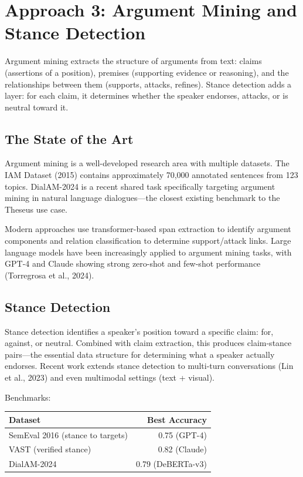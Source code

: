 \documentclass[11pt,letterpaper]{article}
\begin{document}
\section{Approach 3: Argument Mining and Stance Detection}

Argument mining extracts the structure of arguments from text: claims (assertions of a position), premises (supporting evidence or reasoning), and the relationships between them (supports, attacks, refines). Stance detection adds a layer: for each claim, it determines whether the speaker endorses, attacks, or is neutral toward it.

\subsection{The State of the Art}

Argument mining is a well-developed research area with multiple datasets. The IAM Dataset (2015) contains approximately 70,000 annotated sentences from 123 topics. DialAM-2024 is a recent shared task specifically targeting argument mining in natural language dialogues—the closest existing benchmark to the Theseus use case.

Modern approaches use transformer-based span extraction to identify argument components and relation classification to determine support/attack links. Large language models have been increasingly applied to argument mining tasks, with GPT-4 and Claude showing strong zero-shot and few-shot performance (Torregrosa et al., 2024).

\subsection{Stance Detection}

Stance detection identifies a speaker's position toward a specific claim: for, against, or neutral. Combined with claim extraction, this produces claim-stance pairs—the essential data structure for determining what a speaker actually endorses. Recent work extends stance detection to multi-turn conversations (Lin et al., 2023) and even multimodal settings (text + visual).

Benchmarks:
\begin{center}
\begin{tabular}{lr}
  \toprule
  \textbf{Dataset} & \textbf{Best Accuracy} \\
  \midrule
  SemEval 2016 (stance to targets) & 0.75 (GPT-4) \\
  VAST (verified stance) & 0.82 (Claude) \\
  DialAM-2024 & 0.79 (DeBERTa-v3) \\
  \bottomrule
\end{tabular}
\end{center}
\end{document}
